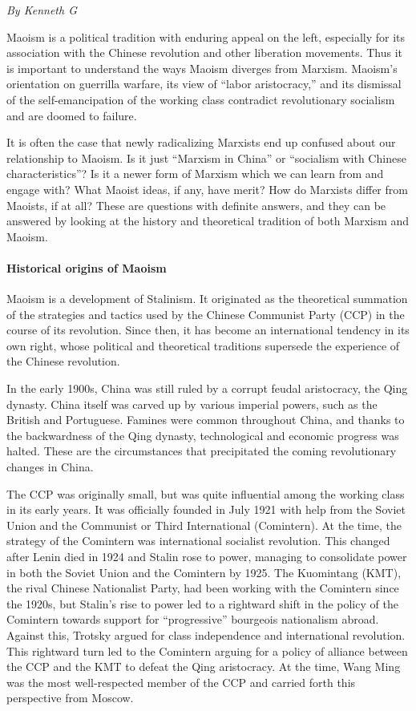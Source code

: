 \emph{By Kenneth G}

Maoism is a political tradition with enduring appeal on the left, especially for its association with the Chinese revolution and other liberation movements. Thus it is important to understand the ways Maoism diverges from Marxism. Maoism's orientation on guerrilla warfare, its view of ``labor aristocracy,'' and its dismissal of the self-emancipation of the working class contradict revolutionary socialism and are doomed to failure.

It is often the case that newly radicalizing Marxists end up confused about our relationship to Maoism. Is it just ``Marxism in China'' or ``socialism with Chinese characteristics''? Is it a newer form of Marxism which we can learn from and engage with? What Maoist ideas, if any, have merit? How do Marxists differ from Maoists, if at all? These are questions with definite answers, and they can be answered by looking at the history and theoretical tradition of both Marxism and Maoism.

\paragraph{Historical origins of Maoism}

Maoism is a development of Stalinism. It originated as the theoretical summation of the strategies and tactics used by the Chinese Communist Party (CCP) in the course of its revolution. Since then, it has become an international tendency in its own right, whose political and theoretical traditions supersede the experience of the Chinese revolution.

In the early 1900s, China was still ruled by a corrupt feudal aristocracy, the Qing dynasty. China itself was carved up by various imperial powers, such as the British and Portuguese. Famines were common throughout China, and thanks to the backwardness of the Qing dynasty, technological and economic progress was halted. These are the circumstances that precipitated the coming revolutionary changes in China.

The CCP was originally small, but was quite influential among the working class in its early years. It was officially founded in July 1921 with help from the Soviet Union and the Communist or Third International (Comintern). At the time, the strategy of the Comintern was international socialist revolution. This changed after Lenin died in 1924 and Stalin rose to power, managing to consolidate power in both the Soviet Union and the Comintern by 1925. The Kuomintang (KMT), the rival Chinese Nationalist Party, had been working with the Comintern since the 1920s, but Stalin's rise to power led to a rightward shift in the policy of the Comintern towards support for ``progressive'' bourgeois nationalism abroad. Against this, Trotsky argued for class independence and international revolution. This rightward turn led to the Comintern arguing for a policy of alliance between the CCP and the KMT to defeat the Qing aristocracy. At the time, Wang Ming was the most well-respected member of the CCP and carried forth this perspective from Moscow.

